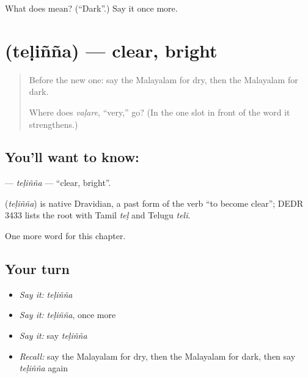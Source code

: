 \begin{tcolorbox}[breakable,colback=teal!4,colframe=teal!35!black,title={Before you move on}]
What does  mean? (\textquotedblleft{}Dark\textquotedblright{}.) Say it once more.
\end{tcolorbox}
\section[\texorpdfstring{\ml{തെളിഞ്ഞ} (teḷiñña)}{തെളിഞ്ഞ (teḷiñña)}]{ (teḷiñña) — clear, bright}

\label{lesson:ML-C167-telinna}



\begin{quote}
Before the new one: say the Malayalam for dry, then the Malayalam for dark.

Where does \emph{vaḷare}, \textquotedblleft{}very,\textquotedblright{} go? (In the one slot in front of the word it strengthens.)
\end{quote}

\subsection*{You'll want to know: }
\textbf{} — \emph{teḷiñña} — \textquotedblleft{}clear, bright\textquotedblright{}.

\begin{cousinweb}
\textbf{} (\emph{teḷiñña}) is native Dravidian, a past form of the verb \textquotedblleft{}to become clear\textquotedblright{}; DEDR 3433 lists the root with Tamil \emph{teḷ} and Telugu \emph{teli}.
\end{cousinweb}

\begin{grammarlens}[title={What you've built}]
One more word for this chapter.
\end{grammarlens}

\subsection*{Your turn}
\begin{itemize}
\raggedright
  \item \emph{Say it:} \emph{teḷiñña}
  \item \emph{Say it:} \emph{teḷiñña}, once more
  \item \emph{Say it:} say \emph{teḷiñña}
  \item \emph{Recall:} say the Malayalam for dry, then the Malayalam for dark, then say \emph{teḷiñña} again
\end{itemize}

